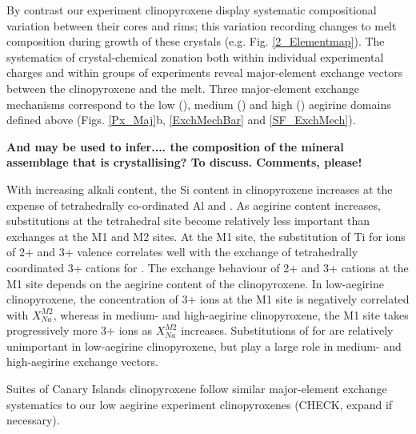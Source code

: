 \documentclass[review,authoryear,12pt]{elsarticle}
\begin{document}
By contrast our experiment clinopyroxene display systematic compositional variation between their cores and rims; this variation recording changes to melt composition during growth of these crystals (e.g. Fig. \ref{2_Elementmap}). 
The systematics of crystal-chemical zonation both within individual experimental charges and within groups of experiments reveal major-element exchange vectors between the clinopyroxene and the melt.
Three major-element exchange mechanisms correspond to the low (), medium () and high () aegirine domains defined above (Figs. \ref{Px_Maj}b, \ref{ExchMechBar} and \ref{SF_ExchMech}). 

\textbf{And may be used to infer.... the composition of the mineral assemblage that is crystallising? To discuss. Comments, please!}

	With increasing alkali content, the Si content in clinopyroxene increases at the expense of tetrahedrally co-ordinated Al and . As aegirine content increases, substitutions at the tetrahedral site become relatively less important than exchanges at the M1 and M2 sites.
	At the M1 site, the substitution of Ti for ions of 2+ and 3+ valence correlates well with the exchange of tetrahedrally coordinated 3+ cations for . 
	The exchange behaviour of 2+ and 3+ cations at the M1 site depends on the aegirine content of the clinopyroxene. In low-aegirine clinopyroxene, the concentration of 3+ ions at the M1 site is negatively correlated with $X_{Na}^{M2}$, whereas in medium- and high-aegirine clinopyroxene, the M1 site takes progressively more 3+ ions as $X_{Na}^{M2}$ increases. Substitutions of  for  are relatively unimportant in low-aegirine clinopyroxene, but play a large role in medium- and high-aegirine exchange vectors.

Suites of Canary Islands clinopyroxene follow similar major-element exchange systematics to our low aegirine experiment clinopyroxenes (CHECK, expand if necessary).



\end{document}
